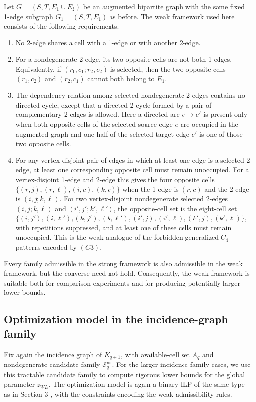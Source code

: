 \documentclass[10pt]{article}
\newcommand{\blue}[1]{#1}
\newcommand{\0}{\mathbf{0}}
\newcommand{\1}{\mathbf{1}}
\begin{document}
\blue{Let \(G=(S,T,E_1\cup E_2)\) be an augmented bipartite graph with the same fixed 1-edge subgraph \(G_1=(S,T,E_1)\) as before. The weak framework used here consists of the following requirements.}
\begin{enumerate}
  \item[(S)] \blue{No 2-edge shares a cell with a 1-edge or with another 2-edge.}
  \item[(W2')] \blue{For a nondegenerate 2-edge, its two opposite cells are not both 1-edges. Equivalently, if \((r_1,c_1;r_2,c_2)\) is selected, then the two opposite cells \((r_1,c_2)\) and \((r_2,c_1)\) cannot both belong to \(E_1\).}
  \item[(W2)] \blue{The dependency relation among selected nondegenerate 2-edges contains no directed cycle, except that a directed 2-cycle formed by a pair of complementary 2-edges is allowed. Here a directed arc \(e\to e'\) is present only when both opposite cells of the selected source edge \(e\) are occupied in the augmented graph and one half of the selected target edge \(e'\) is one of those two opposite cells.}
  \item[(W3)] \blue{For any vertex-disjoint pair of edges in which at least one edge is a selected 2-edge, at least one corresponding opposite cell must remain unoccupied. For a vertex-disjoint 1-edge and 2-edge this gives the four opposite cells \(\{(r,j),(r,\ell),(i,c),(k,c)\}\) when the 1-edge is \((r,c)\) and the 2-edge is \((i,j;k,\ell)\). For two vertex-disjoint nondegenerate selected 2-edges \((i,j;k,\ell)\) and \((i',j';k',\ell')\), the opposite-cell set is the eight-cell set \(\{(i,j'),(i,\ell'),(k,j'),(k,\ell'),(i',j),(i',\ell),(k',j),(k',\ell)\}\), with repetitions suppressed, and at least one of these cells must remain unoccupied. This is the weak analogue of the forbidden generalized \(C_4\)-patterns encoded by \((C3)\).}
\end{enumerate}

\blue{Every family admissible in the strong framework is also admissible in the weak framework, but the converse need not hold. Consequently, the weak framework is suitable both for comparison experiments and for producing potentially larger lower bounds.}

\subsection*{Optimization model in the incidence-graph family}

\blue{Fix again the incidence graph of \(K_{q+1}\), with available-cell set \(A_q\) and nondegenerate candidate family \(\mathcal E_q^{\mathrm{nd}}\). For the larger incidence-family cases, we use this tractable candidate family to compute rigorous lower bounds for the global parameter \(z_{WL}\). The optimization model is again a binary ILP of the same type as in Section 3 \cite{Wol98,CCZ14}, with the constraints encoding the weak admissibility rules.}
\end{document}
